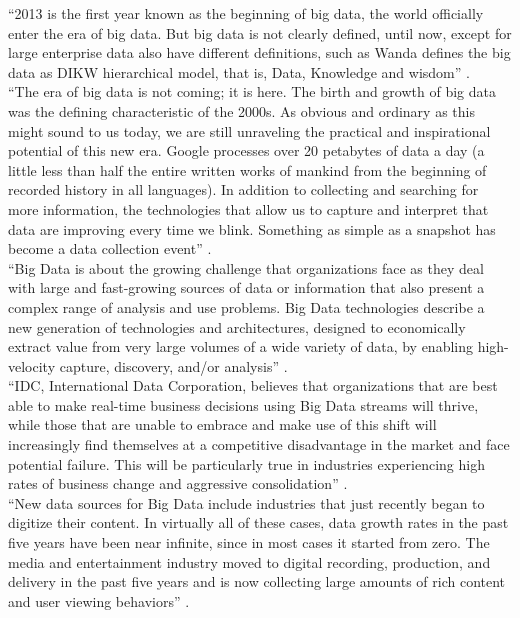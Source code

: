 \documentclass[sigconf]{acmart}
\begin{document}
``2013 is the first year known as the beginning of big data, the world officially enter the era of big data. But big data is not clearly defined, until now, except for large enterprise data also have different definitions, such as Wanda defines the big data as DIKW hierarchical model, that is, Data, Knowledge and wisdom'' \cite{Zhang2017era}. \\
``The era of big data is not coming; it is here. The birth and growth of big data was the defining characteristic of the 2000s. As obvious and ordinary as this might sound to us today, we are still unraveling the practical and inspirational potential of this new era. Google processes over 20 petabytes of data a day (a little less than half the entire written works of mankind from the beginning of recorded history in all languages). In addition to collecting and searching for more information, the technologies that allow us to capture and interpret that data are improving every time we blink. Something as simple as a snapshot has become a data collection event'' \cite{Schlieski2012data}. \\
``Big Data is about the growing challenge that organizations face as they deal with large and fast-growing sources of data or information that also present a complex range of analysis and use problems. Big Data technologies describe a new generation of technologies and architectures, designed to economically extract value from very large volumes of a wide variety of data, by enabling high-velocity capture, discovery, and/or analysis'' \cite{Villars2011care}. \\
``IDC, International Data Corporation, believes that organizations that are best able to make real-time business decisions using Big Data streams will thrive, while those that are unable to embrace and make use of this shift will increasingly find themselves at a competitive disadvantage in the market and face potential failure. This will be particularly true in industries experiencing high rates of business change and aggressive consolidation'' \cite{Villars2011care}. \\
``New data sources for Big Data include industries that just recently began to digitize their content. In virtually all of these cases, data growth rates in the past five years have been near infinite, since in most cases it started from zero. The media and entertainment industry moved to digital recording, production, and delivery in the past five years and is now collecting large amounts of rich content and user viewing behaviors'' \cite{Villars2011care}. \\
\end{document}
